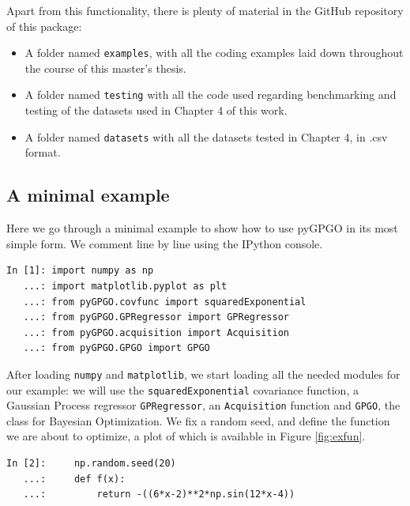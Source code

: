 \documentclass[10pt,a4paper,twoside]{book}
\begin{document}
Apart from this functionality, there is plenty of material in the GitHub repository of this package:

\begin{itemize}
\item A folder named \texttt{examples}, with all the coding examples laid down throughout the course of this master's thesis.
\item A folder named \texttt{testing} with all the code used regarding benchmarking and testing of the datasets used in Chapter 4 of this work.
\item A folder named \texttt{datasets} with all the datasets tested in Chapter 4, in .csv format. 
\end{itemize}

\subsection{A minimal example}

Here we go through a minimal example to show how to use pyGPGO in its most simple form. We comment line by line using the IPython console.

\begin{verbatim}
In [1]: import numpy as np
   ...: import matplotlib.pyplot as plt
   ...: from pyGPGO.covfunc import squaredExponential
   ...: from pyGPGO.GPRegressor import GPRegressor
   ...: from pyGPGO.acquisition import Acquisition
   ...: from pyGPGO.GPGO import GPGO               
\end{verbatim}

After loading \texttt{numpy} and \texttt{matplotlib}, we start loading all the needed modules for our example: we will use the \texttt{squaredExponential} covariance function, a Gaussian Process regressor \texttt{GPRegressor}, an \texttt{Acquisition} function and \texttt{GPGO}, the class for Bayesian Optimization. We fix a random seed, and define the function we are about to optimize, a plot of which is available in Figure \ref{fig:exfun}.

\begin{verbatim}
In [2]:     np.random.seed(20)
   ...:     def f(x):
   ...:         return -((6*x-2)**2*np.sin(12*x-4))
\end{verbatim}
\end{document}
